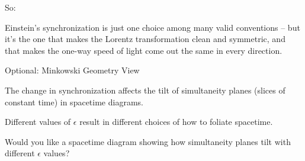 \documentclass[a4paper]{article}
\theoremstyle{plain}
\theoremstyle{definition}
\begin{document}
So:

Einstein's synchronization is just one choice among many valid
conventions -- but it's the one that makes the Lorentz transformation
clean and symmetric, and that makes the one-way speed of light come
out the same in every direction.

Optional: Minkowski Geometry View

The change in synchronization affects the tilt of simultaneity planes
(slices of constant time) in spacetime diagrams.

Different values of $\epsilon$ result in different choices of how to
foliate spacetime.

Would you like a spacetime diagram showing how simultaneity planes
tilt with different $\epsilon$ values?
\end{document}
